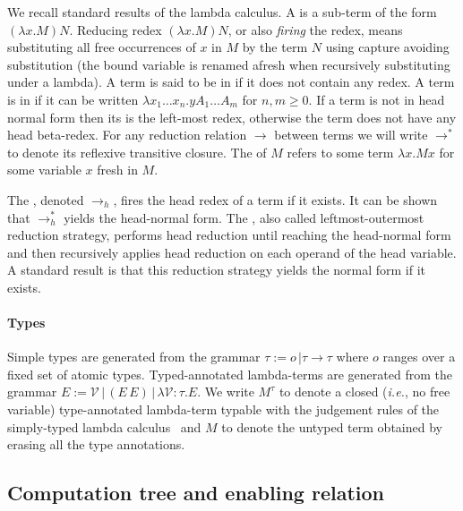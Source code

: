 \documentclass{elsarticle}
\makeatletter
\theoremstyle{plain}
\theoremstyle{definition}
\theoremstyle{remark}
\newcommand\VarSet{\mathcal{V}}
\renewcommand\ie{{\it i.e.\@\xspace}}
\makeatother
\begin{document}
We recall standard results of the lambda calculus.
A  is a sub-term of the form $(\lambda x. M) N$.
Reducing redex $(\lambda x. M) N$, or also \emph{firing} the redex, means substituting all free occurrences of $x$ in $M$ by the term $N$ using capture avoiding substitution (the bound variable is renamed afresh when recursively substituting under a lambda).
A term is said to be in  if it does not contain any redex.
A term is in  if it can be written $\lambda x_1 \ldots x_n . y A_1 \ldots A_m$ for $n,m\geq0$. If a term is not in head normal form then its  is the left-most redex, otherwise the term does not have any head beta-redex. For any reduction relation $\rightarrow$ between terms we will write $\rightarrow^*$ to denote its reflexive transitive closure. The  of $M$ refers to some term $\lambda x. M x $ for some variable $x$ fresh in $M$.

The , denoted $\rightarrow_{h}$, fires the head redex of a term if it exists. It can be shown that $\rightarrow^*_{h}$ yields the head-normal form. The , also called leftmost-outermost reduction strategy, performs head reduction until reaching the head-normal form and then recursively applies head reduction on each operand of the head variable. A standard result is that this reduction strategy yields the normal form if it exists.

\paragraph{Types} Simple types are generated from the grammar $\tau := o\, | \tau \rightarrow \tau$ where $o$ ranges over a fixed set of atomic types. Typed-annotated lambda-terms are generated from the grammar $E := \VarSet\, |\, (E\, E)\, |\, \lambda \VarSet \colon\tau. E $.
We write $M^\tau$ to denote a closed (\ie, no free variable)
type-annotated lambda-term typable with the judgement rules of the simply-typed lambda calculus~\cite{Barendregt84} and $M$ to denote the untyped term obtained by erasing all the type annotations.

\subsection{Computation tree and enabling relation}
\end{document}
